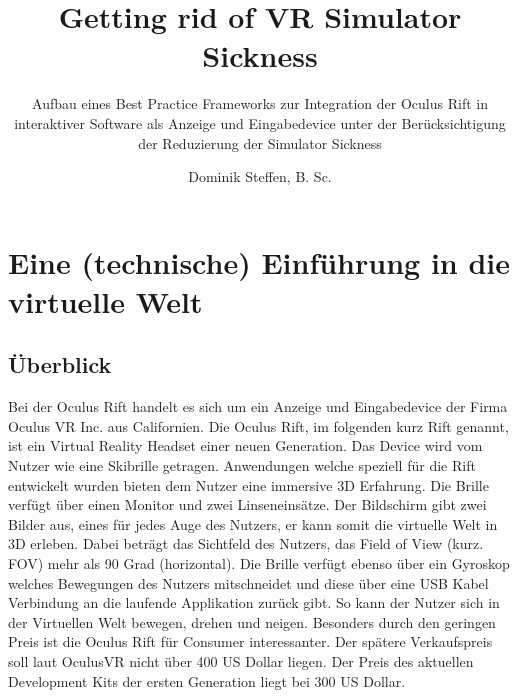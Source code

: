 \documentclass[pagesize, paper=a4, fontsize=12pt,titlepage=true, headings=small, headnosepline, abstractoff, liststotoc, nochapterprefix, plainheadsepline]{scrreprt}
\author{
Dominik Steffen, B. Sc.
}
\title{Getting rid of VR Simulator Sickness}
\subtitle{Aufbau eines Best Practice Frameworks zur Integration der Oculus Rift in interaktiver Software als Anzeige und Eingabedevice unter der Berücksichtigung der Reduzierung der Simulator Sickness}
\begin{document}
\maketitle
%


\begingroup
	\tableofcontents
	\thispagestyle{empty}
\endgroup


\renewcommand*{\chapterpagestyle}{plain}
\pagestyle{plain}
\setcounter{page}{0}

\chapter{Eine (technische) Einführung in die virtuelle Welt}

\section{Überblick}
Bei der Oculus Rift handelt es sich um ein Anzeige und Eingabedevice der Firma Oculus VR Inc. aus Californien. Die Oculus Rift, im folgenden kurz Rift genannt, ist ein Virtual Reality Headset einer neuen Generation. Das Device wird vom Nutzer wie eine Skibrille getragen. Anwendungen welche speziell für die Rift entwickelt wurden bieten dem Nutzer eine immersive 3D Erfahrung. Die Brille verfügt über einen Monitor und zwei Linseneinsätze. Der Bildschirm gibt zwei Bilder aus, eines für jedes Auge des Nutzers, er kann somit die virtuelle Welt in 3D erleben. Dabei beträgt das Sichtfeld des Nutzers, das Field of View (kurz. FOV) mehr als 90 Grad (horizontal). Die Brille verfügt ebenso über ein Gyroskop welches Bewegungen des Nutzers mitschneidet und diese über eine USB Kabel Verbindung an die laufende Applikation zurück gibt. So kann der Nutzer sich in der Virtuellen Welt bewegen, drehen und neigen. Besonders durch den geringen Preis ist die Oculus Rift für Consumer interessanter. Der spätere Verkaufspreis soll laut OculusVR nicht über 400 US Dollar liegen. Der Preis des aktuellen Development Kits der ersten Generation liegt bei 300 US Dollar.
\end{document}
